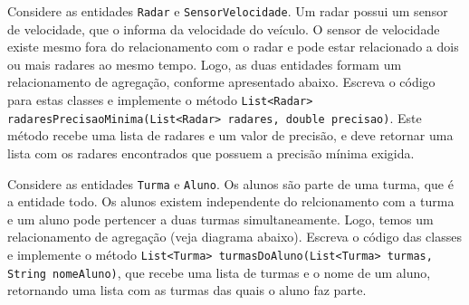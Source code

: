 \begin{exercise}[RadarSensor]
Considere as entidades \texttt{Radar} e \texttt{SensorVelocidade}. Um radar possui um sensor de velocidade, que o informa da velocidade do veículo. O sensor de velocidade existe mesmo fora do relacionamento com o radar e pode estar relacionado a dois ou mais radares ao mesmo tempo. Logo, as duas entidades formam um relacionamento de agregação, conforme apresentado abaixo. Escreva o código para estas classes e implemente o método \texttt{List<Radar> radaresPrecisaoMinima(List<Radar> radares, double precisao)}. Este método recebe uma lista de radares e um valor de precisão, e deve retornar uma lista com os radares encontrados que possuem a precisão mínima exigida.

\begin{figure}[h]
	\centering
	
\end{figure}
\end{exercise}

\begin{exercise}[TurmaAluno]
Considere as entidades \texttt{Turma} e \texttt{Aluno}. Os alunos são parte de uma turma, que é a entidade todo. Os alunos existem independente do relcionamento com a turma e um aluno pode pertencer a duas turmas simultaneamente. Logo, temos um relacionamento de agregação (veja diagrama abaixo). Escreva o código das classes e implemente o método \texttt{List<Turma> turmasDoAluno(List<Turma> turmas, String nomeAluno)}, que recebe uma lista de turmas e o nome de um aluno, retornando uma lista com as turmas das quais o aluno faz parte.

\begin{figure}[h]
	\centering
	
	\end{figure}
\end{exercise}

